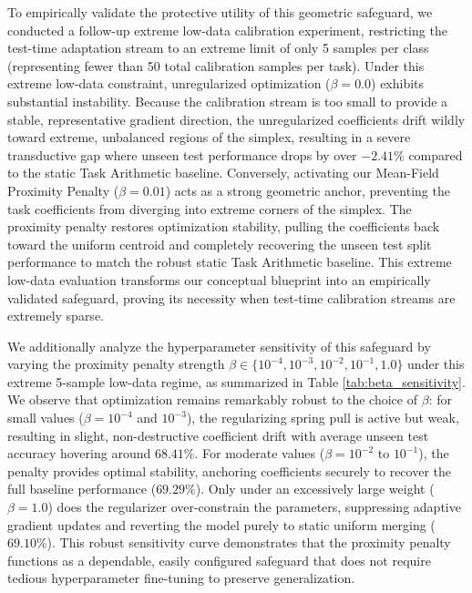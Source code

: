 To empirically validate the protective utility of this geometric safeguard, we conducted a follow-up extreme low-data calibration experiment, restricting the test-time adaptation stream to an extreme limit of only 5 samples per class (representing fewer than 50 total calibration samples per task). Under this extreme low-data constraint, unregularized optimization ($\beta = 0.0$) exhibits substantial instability. Because the calibration stream is too small to provide a stable, representative gradient direction, the unregularized coefficients drift wildly toward extreme, unbalanced regions of the simplex, resulting in a severe transductive gap where unseen test performance drops by over $-2.41\%$ compared to the static Task Arithmetic baseline. Conversely, activating our Mean-Field Proximity Penalty ($\beta = 0.01$) acts as a strong geometric anchor, preventing the task coefficients from diverging into extreme corners of the simplex. The proximity penalty restores optimization stability, pulling the coefficients back toward the uniform centroid and completely recovering the unseen test split performance to match the robust static Task Arithmetic baseline. This extreme low-data evaluation transforms our conceptual blueprint into an empirically validated safeguard, proving its necessity when test-time calibration streams are extremely sparse.

We additionally analyze the hyperparameter sensitivity of this safeguard by varying the proximity penalty strength $\beta \in \{10^{-4}, 10^{-3}, 10^{-2}, 10^{-1}, 1.0\}$ under this extreme 5-sample low-data regime, as summarized in Table \ref{tab:beta_sensitivity}. We observe that optimization remains remarkably robust to the choice of $\beta$: for small values ($\beta = 10^{-4}$ and $10^{-3}$), the regularizing spring pull is active but weak, resulting in slight, non-destructive coefficient drift with average unseen test accuracy hovering around $68.41\%$. For moderate values ($\beta = 10^{-2}$ to $10^{-1}$), the penalty provides optimal stability, anchoring coefficients securely to recover the full baseline performance ($69.29\%$). Only under an excessively large weight ($\beta = 1.0$) does the regularizer over-constrain the parameters, suppressing adaptive gradient updates and reverting the model purely to static uniform merging ($69.10\%$). This robust sensitivity curve demonstrates that the proximity penalty functions as a dependable, easily configured safeguard that does not require tedious hyperparameter fine-tuning to preserve generalization.

